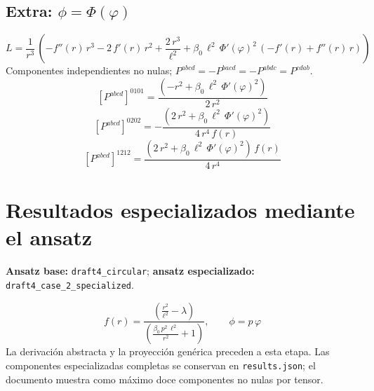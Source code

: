 \documentclass[11pt]{article}
\begin{document}
\subsection*{Extra: $\phi=\Phi\!\left(\varphi\right)$}
\begin{dmath*}[breakdepth={5}]
L=\frac{1}{{r}^{3}}\,\left(-f''\!\left(r\right)\,{r}^{3} - 2\,f'\!\left(r\right)\,{r}^{2} + \frac{2\,{r}^{3}}{{\ell}^{2}} + \beta_{0}\,{\ell}^{2}\,{\Phi'\!\left(\varphi\right)}^{2}\,\left(-f'\!\left(r\right) + f''\!\left(r\right)\,r\right)\right)
\end{dmath*}
Componentes independientes no nulas; $P^{abcd}=-P^{bacd}=-P^{abdc}=P^{cdab}$.
\begin{dmath*}[breakdepth={5}]
\left[P^{abcd}\right]^{0101}=\frac{\left(-{r}^{2} + \beta_{0}\,{\ell}^{2}\,{\Phi'\!\left(\varphi\right)}^{2}\right)}{2\,{r}^{2}}
\end{dmath*}
\begin{dmath*}[breakdepth={5}]
\left[P^{abcd}\right]^{0202}=-\frac{\left(2\,{r}^{2} + \beta_{0}\,{\ell}^{2}\,{\Phi'\!\left(\varphi\right)}^{2}\right)}{4\,{r}^{4}\,f\!\left(r\right)}
\end{dmath*}
\begin{dmath*}[breakdepth={5}]
\left[P^{abcd}\right]^{1212}=\frac{\left(2\,{r}^{2} + \beta_{0}\,{\ell}^{2}\,{\Phi'\!\left(\varphi\right)}^{2}\right)\,f\!\left(r\right)}{4\,{r}^{4}}
\end{dmath*}
\section*{Resultados especializados mediante el ansatz}
\textbf{Ansatz base:} \texttt{draft4\_circular}; \textbf{ansatz especializado:} \texttt{draft4\_case\_2\_specialized}.\par
\begin{dmath*}[breakdepth={4}]
f\!\left(r\right) = \frac{\left(\frac{{r}^{2}}{{\ell}^{2}} - \lambda\right)}{\left(\frac{\beta_{0}\,{p}^{2}\,{\ell}^{2}}{{r}^{2}} + 1\right)},\qquad \phi = p\,\varphi
\end{dmath*}
La derivación abstracta y la proyección genérica preceden a esta etapa. Las componentes especializadas completas se conservan en \texttt{results.json}; el documento muestra como máximo doce componentes no nulas por tensor.
\end{document}
